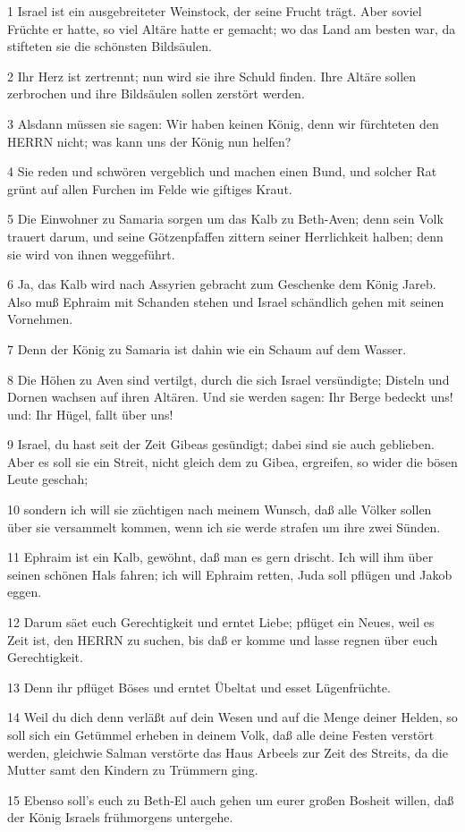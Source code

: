 \par 1 Israel ist ein ausgebreiteter Weinstock, der seine Frucht trägt. Aber soviel Früchte er hatte, so viel Altäre hatte er gemacht; wo das Land am besten war, da stifteten sie die schönsten Bildsäulen.
\par 2 Ihr Herz ist zertrennt; nun wird sie ihre Schuld finden. Ihre Altäre sollen zerbrochen und ihre Bildsäulen sollen zerstört werden.
\par 3 Alsdann müssen sie sagen: Wir haben keinen König, denn wir fürchteten den HERRN nicht; was kann uns der König nun helfen?
\par 4 Sie reden und schwören vergeblich und machen einen Bund, und solcher Rat grünt auf allen Furchen im Felde wie giftiges Kraut.
\par 5 Die Einwohner zu Samaria sorgen um das Kalb zu Beth-Aven; denn sein Volk trauert darum, und seine Götzenpfaffen zittern seiner Herrlichkeit halben; denn sie wird von ihnen weggeführt.
\par 6 Ja, das Kalb wird nach Assyrien gebracht zum Geschenke dem König Jareb. Also muß Ephraim mit Schanden stehen und Israel schändlich gehen mit seinen Vornehmen.
\par 7 Denn der König zu Samaria ist dahin wie ein Schaum auf dem Wasser.
\par 8 Die Höhen zu Aven sind vertilgt, durch die sich Israel versündigte; Disteln und Dornen wachsen auf ihren Altären. Und sie werden sagen: Ihr Berge bedeckt uns! und: Ihr Hügel, fallt über uns!
\par 9 Israel, du hast seit der Zeit Gibeas gesündigt; dabei sind sie auch geblieben. Aber es soll sie ein Streit, nicht gleich dem zu Gibea, ergreifen, so wider die bösen Leute geschah;
\par 10 sondern ich will sie züchtigen nach meinem Wunsch, daß alle Völker sollen über sie versammelt kommen, wenn ich sie werde strafen um ihre zwei Sünden.
\par 11 Ephraim ist ein Kalb, gewöhnt, daß man es gern drischt. Ich will ihm über seinen schönen Hals fahren; ich will Ephraim retten, Juda soll pflügen und Jakob eggen.
\par 12 Darum säet euch Gerechtigkeit und erntet Liebe; pflüget ein Neues, weil es Zeit ist, den HERRN zu suchen, bis daß er komme und lasse regnen über euch Gerechtigkeit.
\par 13 Denn ihr pflüget Böses und erntet Übeltat und esset Lügenfrüchte.
\par 14 Weil du dich denn verläßt auf dein Wesen und auf die Menge deiner Helden, so soll sich ein Getümmel erheben in deinem Volk, daß alle deine Festen verstört werden, gleichwie Salman verstörte das Haus Arbeels zur Zeit des Streits, da die Mutter samt den Kindern zu Trümmern ging.
\par 15 Ebenso soll's euch zu Beth-El auch gehen um eurer großen Bosheit willen, daß der König Israels frühmorgens untergehe.


